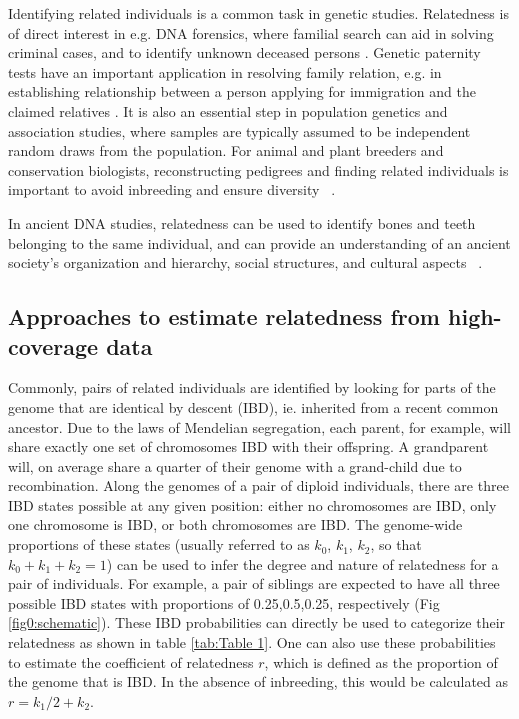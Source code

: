 \documentclass[12pt, letterpaper]{article}
\begin{document}
Identifying related individuals is a common task in genetic studies. Relatedness is of direct interest in e.g. DNA forensics, where familial search can aid in solving criminal cases, and to identify unknown deceased persons \cite{murphy_law_2018,ram_genealogy_2018}. Genetic paternity tests have an important application in resolving family relation, e.g. in establishing relationship between a person applying for immigration and the claimed relatives \cite{egeland_beyond_2000}. It is also an essential  step in population genetics and association studies, where samples are typically assumed to be independent random draws from the population. For animal and plant breeders and conservation biologists, reconstructing pedigrees and finding related individuals is important to avoid inbreeding and ensure diversity ~\cite{habier_impact_2007,oliehoek_estimating_2006,kardos_measuring_2015}.

In ancient DNA studies, relatedness can be used to identify bones and teeth belonging to the same individual, and can provide an understanding of an ancient society's organization and hierarchy, social structures, and cultural aspects ~\cite{baca_ancient_2012,mittnik_KINship-based_2019,sikora_ancient_2017}.


\subsection{Approaches to estimate relatedness from high-coverage data}

Commonly, pairs of related individuals are identified by looking for parts of the genome that are identical by descent (IBD), ie. inherited from a recent common ancestor. Due to the laws of Mendelian segregation, each parent, for example, will share exactly one set of chromosomes IBD with their offspring. A grandparent will, on average share a quarter of their genome with a grand-child due to recombination. Along the genomes of a pair of diploid individuals, there are three IBD states possible at any given position: either no chromosomes are IBD, only one chromosome is IBD, or both chromosomes are IBD. The genome-wide proportions of these states (usually referred to as $k_0$, $k_1$, $k_2$, so that $k_0+k_1+k_2=1$) can be used to infer the degree and nature of relatedness for a pair of individuals. For example, a pair of siblings are expected to have all three possible IBD states with proportions of 0.25,0.5,0.25, respectively (Fig \ref{fig0:schematic}). These IBD probabilities can directly be used to categorize their relatedness as shown in table \ref{tab:Table 1}. One can also use these probabilities to estimate the coefficient of relatedness $r$, which is defined as the proportion of the genome that is IBD. In the absence of inbreeding, this would be calculated as $r= k_1/2 + k_2$.
\end{document}
